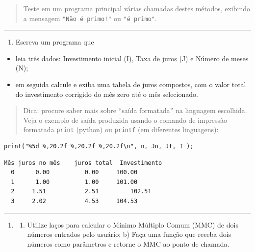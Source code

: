 \documentclass[12pt,a4paper]{article}
\renewcommand{\linethickness}{0.05em}
\providecommand{\tightlist}{%
      \setlength{\itemsep}{0pt}\setlength{\parskip}{0pt}}
\begin{document}
\begin{quote}
Teste em um programa principal várias chamadas destes métodos, exibindo
a mensagem \texttt{"Não\ é\ primo!"} ou \texttt{"é\ primo"}.
\end{quote}

    \begin{center}\rule{0.5\linewidth}{\linethickness}\end{center}

\begin{enumerate}
\def\labelenumi{\arabic{enumi}.}
\setcounter{enumi}{3}
\tightlist
\item
  Escreva um programa que
\end{enumerate}

\begin{itemize}
\tightlist
\item
  leia três dados: Investimento inicial (I), Taxa de juros (J) e Número
  de meses (N);
\item
  em seguida calcule e exiba uma tabela de juros compostos, com o valor
  total do investimento corrigido do mês zero até o mês selecionado.
\end{itemize}

\begin{quote}
Dica: procure saber mais sobre ``saída formatada'' na linguagem
escolhida. Veja o exemplo de saída produzida usando o comando de
impressão formatada \texttt{print} (python) ou \texttt{printf} (em
diferentes linguagens):
\end{quote}

    \begin{verbatim}
print("%5d %,20.2f %,20.2f %,20.2f\n", n, Jn, Jt, I );
\end{verbatim}

    \begin{verbatim}
Mês juros no mês    juros total  Investimento
  0      0.00          0.00     100.00
  1      1.00          1.00     101.00
  2     1.51           2.51         102.51
  3     2.02           4.53     104.53
\end{verbatim}

    \begin{center}\rule{0.5\linewidth}{\linethickness}\end{center}

\begin{enumerate}
\def\labelenumi{\arabic{enumi}.}
\setcounter{enumi}{4}
\item
  \begin{enumerate}
  \def\labelenumii{\alph{enumii})}
  \tightlist
  \item
    Utilize laços para calcular o Mínimo Múltiplo Comum (MMC) de dois
    números entrados pelo usuário; b) Faça uma função que receba dois
    números como parâmetros e retorne o MMC ao ponto de chamada.
  \end{enumerate}
\end{enumerate}
\end{document}
